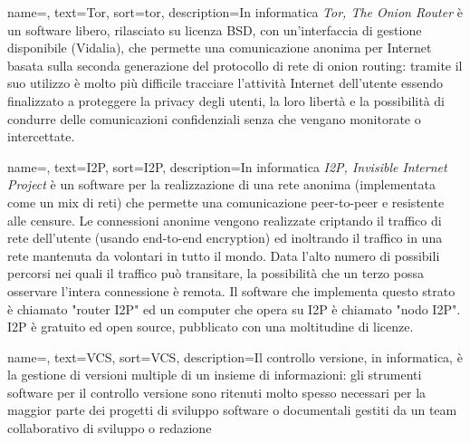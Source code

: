 
\renewcommand{\acronymname}{Acronimi e abbreviazioni}




{
    name=,
    text=Tor,
    sort=tor,
    description={In informatica \emph{Tor, The Onion Router} è un software libero, rilasciato su licenza BSD, con un'interfaccia di gestione disponibile (Vidalia), che permette una comunicazione anonima per Internet basata sulla seconda generazione del protocollo di rete di onion routing: tramite il suo utilizzo è molto più difficile tracciare l'attività Internet dell'utente essendo finalizzato a proteggere la privacy degli utenti, la loro libertà e la possibilità di condurre delle comunicazioni confidenziali senza che vengano monitorate o intercettate.}
}

{
    name=,
    text=I2P,
    sort=I2P,
    description={In informatica \emph{I2P, Invisible Internet Project} è un software per la realizzazione di una rete anonima (implementata come un mix di reti) che permette una comunicazione peer-to-peer e resistente alle censure. Le connessioni anonime vengono realizzate criptando il traffico di rete dell'utente (usando end-to-end encryption) ed inoltrando il traffico in una rete mantenuta da volontari in tutto il mondo. Data l'alto numero di possibili percorsi nei quali il traffico può transitare, la possibilità che un terzo possa osservare l'intera connessione è remota. Il software che implementa questo strato è chiamato "router I2P" ed un computer che opera su I2P è chiamato "nodo I2P". I2P è gratuito ed open source, pubblicato con una moltitudine di licenze.}
}

{
    name=,
    text=VCS,
    sort=VCS,
    description={Il controllo versione, in informatica, è la gestione di versioni multiple di un insieme di informazioni: gli strumenti software per il controllo versione sono ritenuti molto spesso necessari per la maggior parte dei progetti di sviluppo software o documentali gestiti da un team collaborativo di sviluppo o redazione}
}

